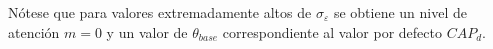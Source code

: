 Nótese que para valores extremadamente altos de $\sigma_{\varepsilon}$ se obtiene un nivel de atención $m=0$ y un valor de $\theta_{base}$ correspondiente al valor por defecto $CAP_d$.





